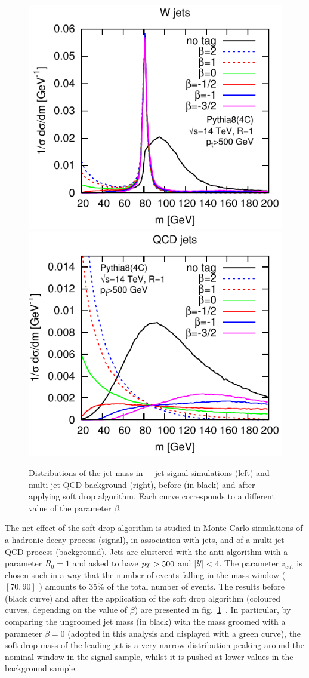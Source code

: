 \begin{figure}[!htb]
  \begin{center}
    \includegraphics[width=.495\textwidth]{figures/Wtagging_W_spectrum.pdf}
    \includegraphics[width=.495\textwidth]{figures/Wtagging_j_spectrum.pdf}
  \end{center}
  \caption{Distributions of the jet mass in \W + jet signal simulations (left) and multi-jet QCD background (right), before (in black) and after applying soft drop algorithm. Each curve corresponds to a different value of the parameter $\beta$.~\cite{Larkoski:2014wba}}
  \label{fig:softdrop_original}
\end{figure}

\noindent The net effect of the soft drop algorithm is studied in Monte Carlo simulations of a \W hadronic decay process (signal), in association with jets, and of a multi-jet QCD process (background). Jets are clustered with the anti-\kt algorithm with a parameter $R_0 = 1$ and asked to have $p_T>500$ \GeV and $|\mathcal{Y}|<4$. The parameter $z_{\text{cut}}$ is chosen such in a way that the number of events falling in the \W mass window ($[70,90]$ \GeV) amounts to 35\% of the total number of events. The results before (black curve) and after the application of the soft drop algorithm (coloured curves, depending on the value of $\beta$) are presented in fig.~\ref{fig:softdrop_original}~\cite{Larkoski:2014wba}. In particular, by comparing the ungroomed jet mass (in black) with the mass groomed with a parameter $\beta = 0$ (adopted in this analysis and displayed with a green curve), the soft drop mass of the leading jet is a very narrow distribution peaking around the nominal \W window in the signal sample, whilst it is pushed at lower values in the background sample.

